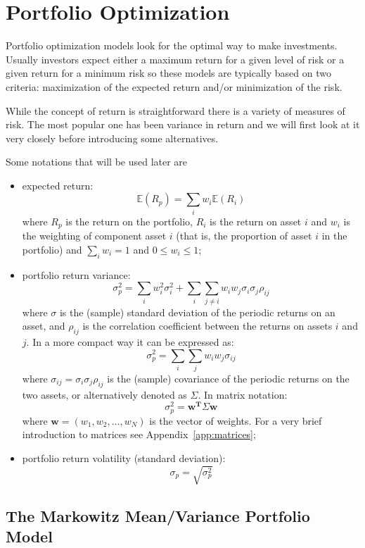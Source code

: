 \chapter{Portfolio Optimization}\label{portfolio-optimization}

Portfolio optimization models look for the optimal way to make investments. Usually investors expect 
either a maximum return for a given level of risk or a given return for a minimum risk so these models
are typically based on two criteria: maximization of the expected return and/or minimization of the risk.

While the concept of return is straightforward there is a variety of measures of risk. 
The most popular one has been variance in return and we will first look at it very closely before 
introducing some alternatives.

Some notations that will be used later are

\begin{itemize}
\tightlist
\item
  expected return: \[ \mathbb{E}(R_{p}) = \sum _{i}w_{i} \mathbb{E}(R_{i}) \] where
  \(R_{p}\) is the return on the portfolio, \(R_{i}\) is the return on
  asset \(i\) and \(w_{i}\) is the weighting of component asset \(i\)
  (that is, the proportion of asset \(i\) in the portfolio) and
  \(\sum_{i}w_i = 1\) and \(0 \le w_i \le 1\);
\item
  portfolio return variance:
  \[ \sigma _{p}^{2} = \sum _{i}w_{i}^{2}\sigma _{i}^{2} + \sum _{i}\sum _{j\neq i}w_{i}w_{j}\sigma _{i}\sigma _{j}\rho _{ij} \]
  where \(\sigma\) is the (sample) standard deviation of the periodic
  returns on an asset, and \(\rho _{ij}\) is the correlation coefficient
  between the returns on assets \(i\) and \(j\). In a more compact way
  it can be expressed as:
  \[ \sigma _{p}^{2}=\sum _{i}\sum _{j}w_{i}w_{j}\sigma _{ij} \] where
  \(\sigma _{ij}=\sigma _{i}\sigma _{j}\rho _{ij}\) is the (sample)
  covariance of the periodic returns on the two assets, or alternatively
  denoted as \(\Sigma\).
  In matrix notation:
  \[\sigma_p^2 = \mathbf{w^T}\Sigma\mathbf{w} \]
  where $\mathbf{w} = (w_1,w_2,\ldots,w_N)$ is the vector of weights. 
  For a very brief introduction to matrices see Appendix~\ref{app:matrices};
\item
  portfolio return volatility (standard deviation):
  \[ \sigma _{p}= \sqrt{\sigma _{p}^{2}}\]
\end{itemize}

\section{The Markowitz Mean/Variance Portfolio Model}
\label{the-markowitz-meanvariance-portfolio-model}

